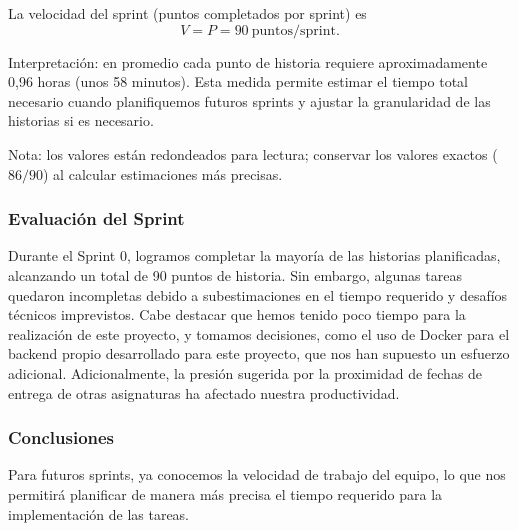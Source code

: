 La velocidad del sprint (puntos completados por sprint) es
\[
	V = P = 90\ \text{puntos/sprint}.
\]

Interpretación: en promedio cada punto de historia requiere aproximadamente 0{,}96 horas (unos 58 minutos). Esta medida permite estimar el tiempo total necesario cuando planifiquemos futuros sprints y ajustar la granularidad de las historias si es necesario.

Nota: los valores están redondeados para lectura; conservar los valores exactos (\(86/90\)) al calcular estimaciones más precisas.

\subsubsection{Evaluación del Sprint}
Durante el Sprint 0, logramos completar la mayoría de las historias planificadas, alcanzando un total de 90 puntos de 
historia. Sin embargo, algunas tareas quedaron incompletas debido a subestimaciones en el tiempo requerido y 
desafíos técnicos imprevistos. Cabe destacar que hemos tenido poco tiempo para la realización de este proyecto,
y tomamos decisiones, como el uso de Docker para el backend propio desarrollado para este proyecto, 
que nos han supuesto un esfuerzo adicional. Adicionalmente, la presión sugerida por la proximidad de fechas de entrega
de otras asignaturas ha afectado nuestra productividad.

\subsubsection{Conclusiones}
Para futuros sprints, ya conocemos la velocidad de trabajo del equipo, lo que nos permitirá planificar de manera 
más precisa el tiempo requerido para la implementación de las tareas.